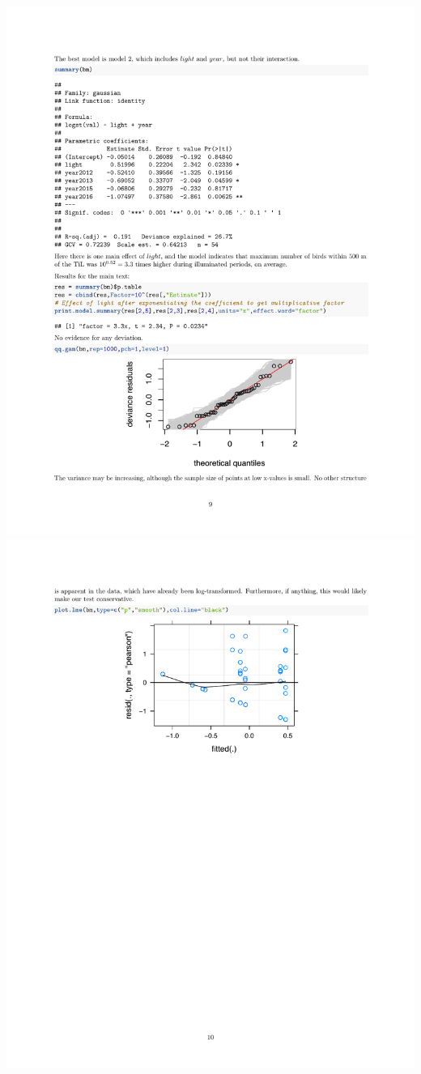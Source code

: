 \documentclass[a4paper, twoside]{templates/ociamthesis}
\begin{document}
\includegraphics[width=1\linewidth]{pdf_chapters/lights/lights_supp_crop_Part43}
\includegraphics[width=1\linewidth]{pdf_chapters/lights/lights_supp_crop_Part44}
\end{document}
